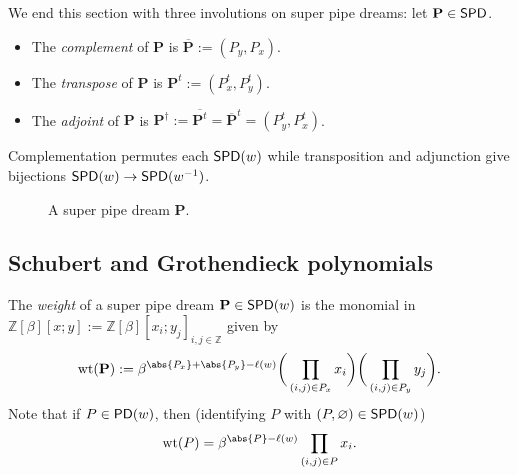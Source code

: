 \documentclass[11pt,reqno]{amsart} %
\makeatletter
\newcommand{\bbZ}{\mathbb{Z}}
\newcommand{\bfP}{\mathbf{P}}
\newcommand{\ol}[1]{\overline{#1}}
\DeclareMathOperator{\wt}{wt}
\DeclareMathOperator{\PD}{\sf{PD}}
\DeclareMathOperator{\SPD}{\sf{SPD}}
\newenvironment{shift}[1][(0,0)]{
    \begin{scope}[shift={#1}]
}{
    \end{scope}
}
\theoremstyle{definition}
\newcommand{\drawHorizontal}[3][color=pipe color]{
    \draw[#1,very thick]
    (#2-0.5,#3) to (#2+0.5,#3);
}
\newcommand{\drawVertical}[3][color=pipe color]{
    \draw[#1,very thick]
    (#2,#3-0.5) to (#2,#3+0.5);
}
\newcommand{\drawRelbow}[3][color=pipe color]{
    \draw[#1,very thick]
    (#2,#3-0.5) to (#2,#3-0.25) to[bend left] (#2+0.25,#3) to (#2+0.5,#3);
}
\newcommand{\drawJelbow}[3][color=pipe color]{
    \draw[#1,very thick]
    (#2-0.5,#3) to (#2-0.25,#3) to[bend right] (#2,#3+0.25) to (#2,#3+0.5);
}
\newcommand{\drawBump}[3][color=pipe color]{
    \drawRelbow[#1]{#2}{#3}
    \drawJelbow[#1]{#2}{#3}
}
\newcommand{\drawSquare}[3][black,opacity=0.5]{
    \draw[#1,thin]
    (#2-0.5,#3+0.5) rectangle (#2+0.5,#3-0.5);
}
\newcommand{\drawGraySquare}[3][gray,opacity=0.3]{
    \filldraw[#1,thin]
    (#2-0.5,#3+0.5) rectangle (#2+0.5,#3-0.5);
}
\newcommand{\drawXCross}[2]{
    \fill[color=x color 2]
    (#1-1/2,#2) -- (#1-1/4,#2+1/4) -- (#1+1/4,#2+1/4) -- (#1+1/2,#2) -- (#1+1/4,#2-1/4) -- (#1-1/4,#2-1/4);
    \drawHorizontal[x color 1]{#1}{#2}
    \drawVertical[x color 1]{#1}{#2}
}
\newcommand{\drawYCross}[2]{
    \fill[color=y color 2]
    (#1,#2-1/2) -- (#1+1/4,#2-1/4) -- (#1+1/4,#2+1/4) -- (#1,#2+1/2) -- (#1-1/4,#2+1/4) -- (#1-1/4,#2-1/4);
    \drawHorizontal[y color 1]{#1}{#2}
    \drawVertical[y color 1]{#1}{#2}
}
\newcommand{\drawXYCross}[2]{
    \fill[color=y color 2] (#1,#2) -- (#1+1/4,#2+1/4) -- (#1,#2+1/2) -- (#1-1/4,#2+1/4);
    \fill[color=y color 2] (#1,#2) -- (#1+1/4,#2-1/4) -- (#1,#2-1/2) -- (#1-1/4,#2-1/4);
    \fill[color=x color 2] (#1,#2) -- (#1+1/4,#2+1/4) -- (#1+1/2,#2) -- (#1+1/4,#2-1/4);
    \fill[color=x color 2] (#1,#2) -- (#1-1/4,#2+1/4) -- (#1-1/2,#2) -- (#1-1/4,#2-1/4);
    \drawVertical[y color 1]{#1}{#2}
    \drawHorizontal[x color 1]{#1}{#2}
}
\newcommand{\checkerradius}{0.38}
\newcommand{\drawXChecker}[2]{
    \fill[color=x color 2] (#1,#2) circle (\checkerradius);
    \fill[
        color=x color 1,
        pattern color=x color 1,
        pattern={Lines[distance=2pt]},
        thick
    ] (#1,#2) circle (\checkerradius);
    \draw[color=x color 1,thick] (#1,#2) circle (\checkerradius);
}
\newcommand{\drawYChecker}[2]{
    \fill[color=y color 2] (#1,#2) circle (\checkerradius);
    \fill[
        color=y color 1,
        pattern color=y color 1,
        pattern={Lines[distance=1.5pt,angle=90]},
    ] (#1,#2) circle (\checkerradius);
    \draw[color=y color 1, thick] (#1,#2) circle (\checkerradius);
}
\newcommand{\drawXYChecker}[2]{
    \drawXChecker{#1}{#2}
    \drawYChecker{#1-0.1}{#2+0.1}
}
\newcommand{\drawPDTile}[3]{

    \ifnum #3=0 \drawBump{#1}{#2} \fi
    \ifnum #3=1 \drawXCross{#1}{#2} \fi
    \ifnum #3=2 \drawYCross{#1}{#2} \fi
    \ifnum #3=3 \drawXYCross{#1}{#2}\fi
    \ifnum #3=4 \fi
    \ifnum #3=5 \fi
    \ifnum #3=6 \fi
    \ifnum #3=7 \fi
    \ifnum #3=8 \drawRelbow{#1}{#2} \fi
    \ifnum #3=9 \fi %
}
\newcommand{\drawPD}[3]{
    \PD@i = 1
    \PD@j = 1
    \foreach \t in {#3}{
        \drawPDTile{\number\PD@j}{-\number\PD@i}{\t}
        \drawSquare{\number\PD@j}{-\number\PD@i}
        
        \ifnum\PD@j < \numexpr#2\relax
            \global\advance\PD@j by 1
        \else
            \global\PD@j = 1
            \global\advance\PD@i by 1
        \fi
    }
}
\newcommand{\drawRCGraphTile}[3]{

    \ifnum #3=0 \fi %
    \ifnum #3=1 \drawXChecker{#1}{#2} \fi
    \ifnum #3=2 \drawYChecker{#1}{#2} \fi
    \ifnum #3=3 \drawXYChecker{#1}{#2} \fi
    \ifnum #3=4 \drawGraySquare{#1}{#2}\drawXChecker{#1}{#2} \fi
    \ifnum #3=5 \drawGraySquare{#1}{#2}\drawYChecker{#1}{#2} \fi
    \ifnum #3=6 \fi
    \ifnum #3=7 \fi
    \ifnum #3=8 \fi
    \ifnum #3=9 \drawGraySquare{#1}{#2} \fi
}
\newcommand{\drawRCGraph}[3]{
    \PD@i = 1
    \PD@j = 1
    \foreach \t in {#3}{
        \drawRCGraphTile{\number\PD@j}{-\number\PD@i}{\t}
        \drawSquare{\number\PD@j}{-\number\PD@i}
        
        \ifnum\PD@j < \numexpr#2\relax
            \global\advance\PD@j by 1
        \else
            \global\PD@j = 1
            \global\advance\PD@i by 1
        \fi
    }
}
\newcommand{\drawNorthLabels}[3]{
    \PD@j = 0
    \foreach \j in {#3}{
        \node at (#2+\PD@j,-#1) {\j};
        \global\advance\PD@j by 1
    }
}
\newcommand{\drawWestLabels}[3]{
    \PD@i = 0
    \foreach \i in {#3}{
        \node at (#2,-#1-\PD@i) {\i};
        \global\advance\PD@i by 1
    }
}
\makeatother
\begin{document}
We end this section with three involutions on super pipe dreams: let $\bfP\in \SPD$.
\begin{itemize}
\item
The \textit{complement} of $\bfP$ is $\ol{\bfP} := (P_y,P_x)$.
\item
The \textit{transpose} of $\bfP$ is $\bfP^t := (P_x^t,P_y^t)$.
\item
The \textit{adjoint} of $\bfP$ is $\bfP^\dagger := \ol{\bfP^t} = \ol{\bfP}^t = (P_y^t,P_x^t)$.
\end{itemize}
Complementation permutes each $\SPD(w)$ while transposition and adjunction give bijections $\SPD(w)\to \SPD(w^{-1})$.


\begin{figure}

\caption{
    A super pipe dream $\bfP$.
}
\label{fig:super pipe dream}
\end{figure}



\subsection{Schubert and Grothendieck polynomials}
\label{subsect:Schubert polys}

The \textit{weight} of a super pipe dream $\bfP\in \SPD(w)$ is the monomial in $\bbZ[\beta][x;y] := \bbZ[\beta][x_i;y_j]_{i,j\in\bbZ}$ given by \[
    \wt(\bfP) := \beta^{\abs{P_x}+\abs{P_y}-\ell(w)}
    \bigg(\prod_{(i,j)\in P_x} x_i\bigg)
    \bigg(\prod_{(i,j)\in P_y} y_j\bigg).
\]
Note that if $P\in \PD(w)$, then (identifying $P$ with $(P,\varnothing)\in \SPD(w)$) \[
    \wt(P) = \beta^{\abs{P}-\ell(w)}\prod_{(i,j)\in P} x_i.
\]
\end{document}
